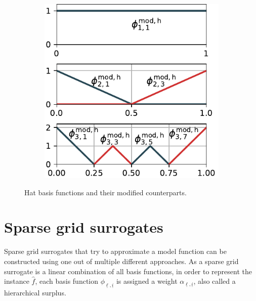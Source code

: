 \documentclass[
  a4paper,  %
  twoside,  %
  bibliography=totoc,
  headsepline,
  cleardoublepage=empty,
  parskip=half,
  draft=false
]{scrbook}
\begin{document}
\begin{mdframed}[style=style]
\begin{figure}[H]
\begin{subfigure}{.5\textwidth}
  \includegraphics[width=\linewidth]{graphics/basis_mod}
  \label{fig:basis_hat_mod}
\vspace{1.5mm}
\end{subfigure}
  \delimit
\caption{Hat basis functions and their modified counterparts.}
  \label{fig:basis_hat}
\end{figure}
\end{mdframed}

\section{Sparse grid surrogates}
\label{sec:gsc}

Sparse grid surrogates that try to approximate a model function can be constructed using one out of multiple different approaches.
As a sparse grid surrogate is a linear combination of all basis functions, in order to represent the instance $\hat{f}$, each basis function $\phi_{\underline{\ell},\underline{i}}$ is assigned a weight $\alpha_{\underline{\ell},\underline{i}}$, also called a hierarchical surplus.
\end{document}

